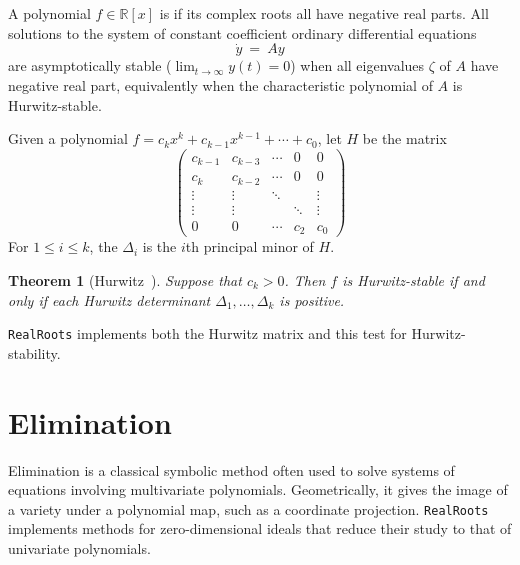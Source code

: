 \documentclass[12pt]{amsart}
\newtheorem{theorem}{Theorem}
\theoremstyle{definition}
\newcommand{\RR}{\mathbb{R}}
\newcommand{\defcolor}[1]{{\color{TAMU}#1}}
\newcommand{\demph}[1]{\defcolor{{\sl #1}}}
\begin{document}
A polynomial $f\in\RR[x]$ is \demph{Hurwitz-stable} if its complex roots all have negative real parts.
All solutions to the system of constant coefficient ordinary differential equations 
%
 \[
  \dot{y}\ =\ Ay
 \]
%
are asymptotically stable ($\lim_{t\to\infty}y(t)=0$) when all eigenvalues $\zeta$ of $A$ have negative real part,
equivalently when the characteristic polynomial of $A$ is Hurwitz-stable.
 
Given a polynomial $f=c_kx^k+c_{k-1}x^{k-1}+\dotsb+c_0$,  let \defcolor{$H$} be the matrix
\[
\left(\begin{matrix}
  c_{k-1} & c_{k-3} & \dotsb & 0  & 0 \\
  c_k    & c_{k-2} &  \dotsb& 0 & 0 \\
  \vdots & \vdots & \ddots&    &\vdots\\
  \vdots & \vdots & & \ddots&\vdots\\
    0    &    0   & \dotsb&c_2 & c_0
\end{matrix}\right)
\]
For $1\leq i\leq k$, the \demph{Hurwitz determinant} \defcolor{$\Delta_i$} is the $i$th principal minor of $H$.


\begin{theorem}[Hurwitz~\cite{Hurwitz}]
  Suppose that $c_k>0$.
  Then $f$ is Hurwitz-stable if and only if each Hurwitz determinant $\Delta_{1},\dots,\Delta_{k}$ is positive.
\end{theorem}

\texttt{RealRoots} implements both the Hurwitz matrix and this test for Hurwitz-stability.
%
\begin{leftbar}

\end{leftbar}
%



\section{Elimination}\label{S:two}

Elimination is a classical symbolic method often used to solve systems of equations involving multivariate polynomials.
Geometrically, it gives the image of a variety under a polynomial map, such as a coordinate projection.
\texttt{RealRoots} implements methods for zero-dimension\-al ideals that reduce their study to that of univariate polynomials.
\end{document}
